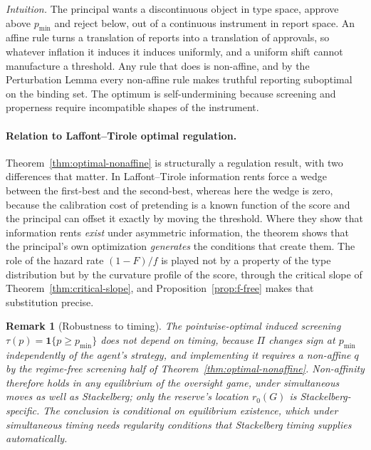 \documentclass[acmsmall,nonacm,screen]{acmart}
\theoremstyle{acmplain}%
\theoremstyle{acmdefinition}%
\newtheorem{remark}[theorem]{Remark}%
\numberwithin{equation}{section}
\begin{document}
\emph{Intuition.} The principal wants a discontinuous object in type space, approve above $p_{\min}$ and reject below, out of a continuous instrument in report space. An affine rule turns a translation of reports into a translation of approvals, so whatever inflation it induces it induces uniformly, and a uniform shift cannot manufacture a threshold. Any rule that does is non-affine, and by the Perturbation Lemma every non-affine rule makes truthful reporting suboptimal on the binding set. The optimum is self-undermining because screening and properness require incompatible shapes of the instrument.

\paragraph{Relation to Laffont--Tirole optimal regulation.}
Theorem~\ref{thm:optimal-nonaffine} is structurally a \citet{laffont1993theory} regulation result, with two differences that matter. In Laffont--Tirole information rents force a wedge between the first-best and the second-best, whereas here the wedge is zero, because the calibration cost of pretending is a known function of the score and the principal can offset it exactly by moving the threshold. Where they show that information rents \emph{exist} under asymmetric information, the theorem shows that the principal's own optimization \emph{generates} the conditions that create them. The role of the hazard rate $(1-F)/f$ is played not by a property of the type distribution but by the curvature profile of the score, through the critical slope of Theorem~\ref{thm:critical-slope}, and Proposition~\ref{prop:f-free} makes that substitution precise.

\begin{remark}[Robustness to timing]\label{rem:timing-robustness}
The pointwise-optimal induced screening $\tau(p) = \mathbf 1\{p \ge p_{\min}\}$ does not depend on timing, because $\Pi$ changes sign at $p_{\min}$ independently of the agent's strategy, and implementing it requires a non-affine $q$ by the regime-free screening half of Theorem~\ref{thm:optimal-nonaffine}. Non-affinity therefore holds in any equilibrium of the oversight game, under simultaneous moves as well as Stackelberg; only the reserve's location $r_0(G)$ is Stackelberg-specific. The conclusion is conditional on equilibrium existence, which under simultaneous timing needs regularity conditions that Stackelberg timing supplies automatically.
\end{remark}
\end{document}
